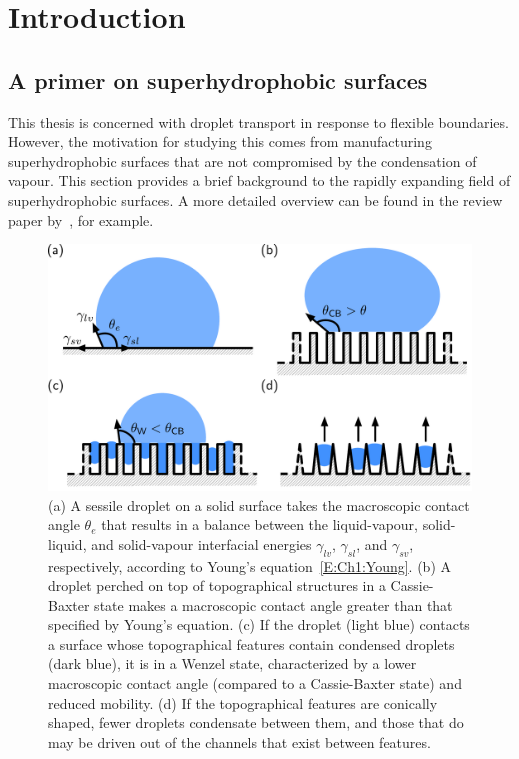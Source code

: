 \graphicspath{{./Sections/Chapter1_intro/figures/}}
\chapter{Introduction}
\section{A primer on superhydrophobic surfaces}\label{S:Ch1:superhydrophobic}
This thesis is concerned with droplet transport in response to flexible boundaries. However, the motivation for studying this comes from manufacturing superhydrophobic surfaces that are not compromised by the condensation of vapour. This section provides a brief background to the rapidly expanding field of superhydrophobic surfaces. A more detailed overview can be found in the review paper by~\cite{Simpson2015RepProgPhys}, for example.

\begin{figure}[t]
\centering
\includegraphics[scale=0.42]{Texturing}
\caption{(a) A sessile droplet on a solid surface takes the macroscopic contact angle $\theta_e$ that results in a balance between the  liquid-vapour, solid-liquid, and solid-vapour interfacial energies $\gamma_{lv}$, $\gamma_{sl}$, and $\gamma_{sv}$, respectively, according to Young's equation~\eqref{E:Ch1:Young}. (b) A droplet perched on top of topographical structures in a Cassie-Baxter state makes a macroscopic contact angle greater than that specified by Young's equation. (c) If the droplet (light blue) contacts a surface whose topographical features contain condensed droplets (dark blue), it is in a Wenzel state, characterized by a lower macroscopic contact angle (compared to a Cassie-Baxter state) and reduced mobility. (d) If the topographical features are conically shaped, fewer droplets condensate between them, and those that do may be driven out of the channels that exist between features.}\label{fig:Ch1:Textured}
\end{figure}



